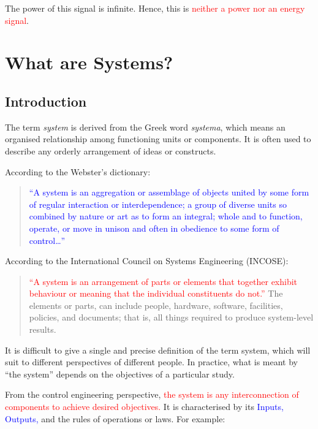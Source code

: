 \documentclass[
  14pt,
  a4paper,
  oneside,
  open=any,
  a4paper,
  14pt]{report}
\begin{document}
The power of this signal is infinite. Hence, this is
\textcolor{red}{neither a power nor an energy signal}.

\section{What are Systems?}\label{what-are-systems}

\subsection{Introduction}\label{introduction-2}

The term \emph{system} is derived from the Greek word \emph{systema},
which means an organised relationship among functioning units or
components. It is often used to describe any orderly arrangement of
ideas or constructs.

According to the Webster's dictionary:

\begin{quote}
\textcolor{blue}{``A system is an aggregation or assemblage of objects
united by some form of regular interaction or interdependence; a group
of diverse units so combined by nature or art as to form an integral;
whole and to function, operate, or move in unison and often in obedience
to some form of control\ldots{}''}
\end{quote}

According to the International Council on Systems Engineering (INCOSE):

\begin{quote}
\textcolor{red}{``A system is an arrangement of parts or elements that
together exhibit behaviour or meaning that the individual constituents
do not.''} The elements or parts, can include people, hardware,
software, facilities, policies, and documents; that is, all things
required to produce system-level results.
\end{quote}

It is difficult to give a single and precise definition of the term
system, which will suit to different perspectives of different people.
In practice, what is meant by ``the system'' depends on the objectives
of a particular study.

From the control engineering perspective, \textcolor{red}{the system is
any interconnection of components to achieve desired objectives.} It is
characterised by its \textcolor{blue}{Inputs, Outputs,} and the rules of
operations or laws. For example:
\end{document}
